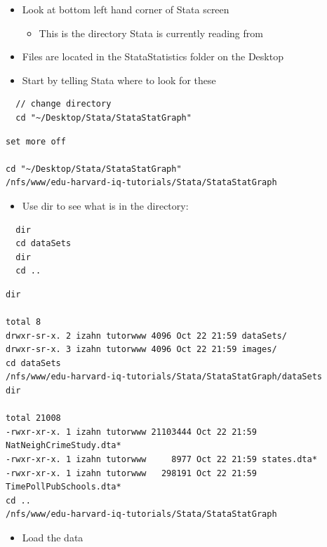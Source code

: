 \documentclass[]{book}
\providecommand{\tightlist}{%
  \setlength{\itemsep}{0pt}\setlength{\parskip}{0pt}}
\begin{document}
\begin{itemize}
\tightlist
\item
  Look at bottom left hand corner of Stata screen

  \begin{itemize}
  \tightlist
  \item
    This is the directory Stata is currently reading from
  \end{itemize}
\item
  Files are located in the StataStatistics folder on the Desktop
\item
  Start by telling Stata where to look for these
\end{itemize}

\begin{verbatim}
  // change directory
  cd "~/Desktop/Stata/StataStatGraph"
\end{verbatim}

\begin{verbatim}
set more off

cd "~/Desktop/Stata/StataStatGraph"
/nfs/www/edu-harvard-iq-tutorials/Stata/StataStatGraph
\end{verbatim}

\begin{itemize}
\tightlist
\item
  Use dir to see what is in the directory:
\end{itemize}

\begin{verbatim}
  dir
  cd dataSets
  dir
  cd ..
\end{verbatim}

\begin{verbatim}
dir

total 8
drwxr-sr-x. 2 izahn tutorwww 4096 Oct 22 21:59 dataSets/
drwxr-sr-x. 3 izahn tutorwww 4096 Oct 22 21:59 images/
cd dataSets
/nfs/www/edu-harvard-iq-tutorials/Stata/StataStatGraph/dataSets
dir

total 21008
-rwxr-xr-x. 1 izahn tutorwww 21103444 Oct 22 21:59 NatNeighCrimeStudy.dta*
-rwxr-xr-x. 1 izahn tutorwww     8977 Oct 22 21:59 states.dta*
-rwxr-xr-x. 1 izahn tutorwww   298191 Oct 22 21:59 TimePollPubSchools.dta*
cd ..
/nfs/www/edu-harvard-iq-tutorials/Stata/StataStatGraph
\end{verbatim}

\begin{itemize}
\tightlist
\item
  Load the data
\end{itemize}
\end{document}
